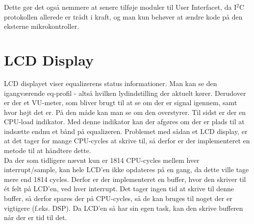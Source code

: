 Dette gør det også nemmere at senere tilføje moduler til User Interfacet, da I$^2$C protokollen allerede er trådt i kraft, og man kun behøver at ændre kode på den eksterne mikrokontroller.

\section{LCD Display}\label{sec:lcd}
LCD displayet viser equalizerens status informationer. Man kan se den igangværende eq-profil - altså hvilken lydindstilling der aktuelt kører. Derudover er der et VU-meter, som bliver brugt til at se om der er signal igennem, samt hvor højt det er. På den måde kan man se om den overstyrer. Til sidst er der en CPU-load indikator. Med denne indikator kan der afgøres om der er plads til at indsætte endnu et bånd på equalizeren. Problemet med sådan et LCD display, er at det tager for mange CPU-cycles at skrive til, så derfor er der implementeret en metode til at håndtere dette. \\

Da der som tidligere nævnt kun er 1814 CPU-cycles mellem hver interrupt/sample, kan hele LCD'en ikke opdateres på en gang, da dette ville tage mere end 1814 cycles. Derfor er der implementeret en buffer, hvor den skriver til ét felt på LCD'en, ved hver interrupt. Det tager ingen tid at skrive til denne buffer, så derfor spares der på CPU-cycles, så de kan bruges til noget der er vigtigere (f.eks. DSP). Da LCD'en så har sin egen task, kan den skrive bufferen når der er tid til det. 